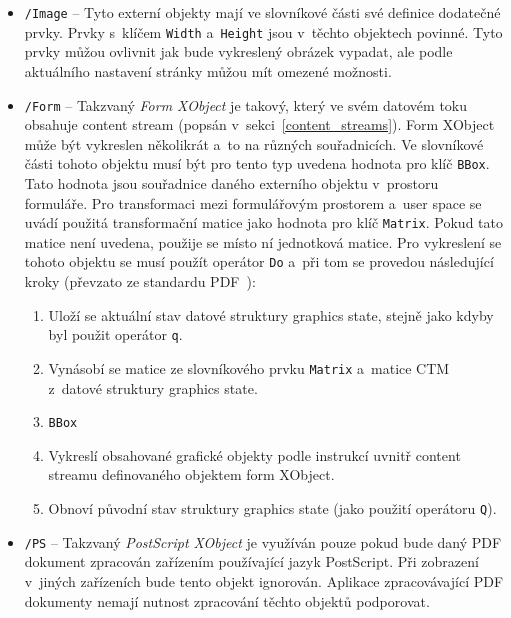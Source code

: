 \begin{itemize}
    \item \texttt{/Image} -- Tyto externí objekty mají ve slovníkové části své
    definice dodatečné prvky. Prvky s~klíčem \texttt{Width} a~\texttt{Height}
    jsou v~těchto objektech povinné. Tyto prvky můžou ovlivnit jak bude
    vykreslený obrázek vypadat, ale podle aktuálního nastavení stránky můžou mít
    omezené možnosti. 
    
    \item \texttt{/Form} -- Takzvaný \emph{Form XObject} je takový, který ve svém
    datovém toku obsahuje content stream (popsán v~sekci~\ref{content_streams}).
    Form XObject může být vykreslen několikrát a~to na různých souřadnicích.
    Ve slovníkové části tohoto objektu musí být pro tento typ uvedena hodnota
    pro klíč \texttt{BBox}. Tato hodnota jsou souřadnice daného externího objektu
    v~prostoru formuláře. Pro transformaci mezi formulářovým prostorem a~user
    space se uvádí použitá transformační matice jako hodnota pro klíč
    \texttt{Matrix}. Pokud tato matice není uvedena, použije se místo ní
    jednotková matice. Pro vykreslení se tohoto objektu se musí použít operátor
    \texttt{Do} a~při tom se provedou následující kroky (převzato ze standardu
    PDF~\cite{PDF32000-1:2008}):
    \begin{enumerate}
        \item Uloží se aktuální stav datové struktury graphics state, stejně
        jako kdyby byl použit operátor \texttt{q}.
        \item Vynásobí se matice ze slovníkového prvku \texttt{Matrix} a~matice
        CTM z~datové struktury graphics state.
        \item \texttt{BBox} 
        \item Vykreslí obsahované  grafické objekty podle instrukcí uvnitř content
        streamu definovaného objektem form XObject.
        \item Obnoví původní stav struktury graphics state (jako použití operátoru
        \texttt{Q}).
    \end{enumerate}
    
    \item \texttt{/PS} -- Takzvaný \emph{PostScript XObject} je využíván pouze
    pokud bude daný PDF dokument zpracován zařízením používající jazyk PostScript.
    Při zobrazení v~jiných zařízeních bude tento objekt ignorován. Aplikace
    zpracovávající PDF dokumenty nemají nutnost zpracování těchto objektů
    podporovat.
\end{itemize}


